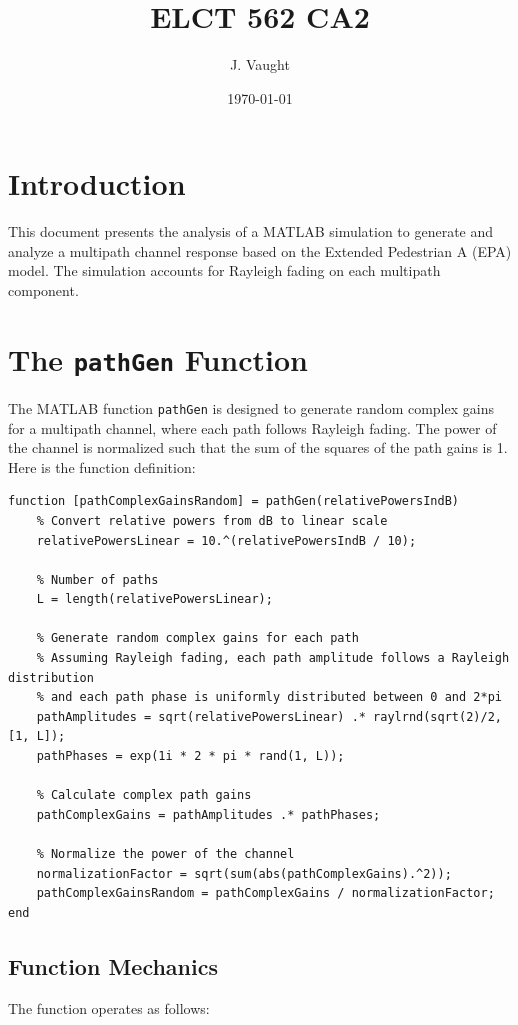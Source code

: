 \documentclass[12pt]{article}
\title{ELCT 562 CA2}
\author{J. Vaught}
\date{\today}
\begin{document}
\maketitle

\section{Introduction}
This document presents the analysis of a MATLAB simulation to generate and analyze a multipath channel response based on the Extended Pedestrian A (EPA) model. The simulation accounts for Rayleigh fading on each multipath component.

\section{The \texttt{pathGen} Function}
The MATLAB function \texttt{pathGen} is designed to generate random complex gains for a multipath channel, where each path follows Rayleigh fading. The power of the channel is normalized such that the sum of the squares of the path gains is 1. Here is the function definition:

\begin{verbatim}
function [pathComplexGainsRandom] = pathGen(relativePowersIndB)
    % Convert relative powers from dB to linear scale
    relativePowersLinear = 10.^(relativePowersIndB / 10);
    
    % Number of paths
    L = length(relativePowersLinear);

    % Generate random complex gains for each path
    % Assuming Rayleigh fading, each path amplitude follows a Rayleigh distribution
    % and each path phase is uniformly distributed between 0 and 2*pi
    pathAmplitudes = sqrt(relativePowersLinear) .* raylrnd(sqrt(2)/2, [1, L]);
    pathPhases = exp(1i * 2 * pi * rand(1, L));

    % Calculate complex path gains
    pathComplexGains = pathAmplitudes .* pathPhases;

    % Normalize the power of the channel
    normalizationFactor = sqrt(sum(abs(pathComplexGains).^2));
    pathComplexGainsRandom = pathComplexGains / normalizationFactor;
end
\end{verbatim}

\subsection{Function Mechanics}
The function operates as follows:
\end{document}
